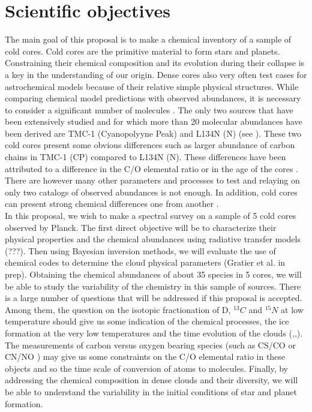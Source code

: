 \section{Scientific objectives}

The main goal of this proposal is to make a chemical inventory of a sample of cold cores. Cold cores are the primitive material to form stars and planets. Constraining their chemical composition and its evolution during their collapse is a key in the understanding of our origin. Dense cores also very often test cases for astrochemical models because of their relative simple physical structures. While comparing chemical model predictions with observed abundances, it is necessary to consider a significant number of molecules \cite{Wakelam_2006,2013ChRv..113.8710A}. The only two sources that have been extensively studied and for which more than 20 molecular abundances have been derived are TMC-1 (Cyanopolyyne Peak) and L134N (N) (see \cite{2013ChRv..113.8710A}). These two cold cores present some obvious differences such as larger abundance of carbon chains in TMC-1 (CP) compared to L134N (N). These differences have been attributed to a difference in the C/O elemental ratio \cite{1998ApJ...501..207T} or in the age of the cores \cite{2013ChRv..113.8710A}. There are however many other parameters and processes to test and relaying on only two catalogs of observed abundances is not enough. In addition, cold cores can present strong chemical differences one from another \cite{2006FaDi..133...63B}.\\
In this proposal, we wish to make a spectral survey on a sample of 5 cold cores observed by Planck. The first direct objective will be to characterize their physical properties and the chemical abundances using radiative transfer models (???). Then using Bayesian inversion methods, we will evaluate the use of chemical codes to determine the cloud physical parameters (Gratier et al. in prep). Obtaining the chemical abundances of about 35 species in 5 cores, we will be able to study the variability of the chemistry in this sample of sources. There is a large number of questions that will be addressed if this proposal is accepted. Among them, the question on the isotopic fractionation of D, $^{13}C$ and $^{15}N$ at low temperature should give us some indication of the chemical processes, the ice formation at the very low temperatures and the time evolution of the clouds (\cite{2013A&A...551A..38P},\cite{2014prpl.conf..859C},\cite{2015A&A...576A..99R}). The measurements of carbon versus oxygen bearing species (such as CS/CO \cite{1997ApJ...482..285B} or CN/NO \cite{2014A&A...562A..83L}) may give us some constraints on the C/O elemental ratio in these objects and so the time scale of conversion of atoms to molecules. Finally, by addressing the chemical composition in dense clouds and their diversity, we will be able to understand the variability in the initial conditions of star and planet formation. 

  